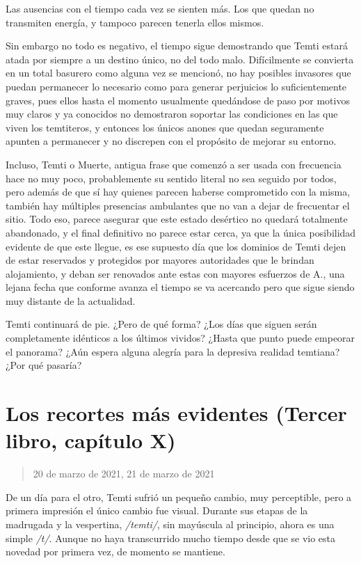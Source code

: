 \documentclass[
]{book}
\begin{document}
Las ausencias con el tiempo cada vez se sienten más. Los que quedan no transmiten energía, y tampoco parecen tenerla ellos mismos.

Sin embargo no todo es negativo, el tiempo sigue demostrando que Temti estará atada por siempre a un destino único, no del todo malo. Difícilmente se convierta en un total basurero como alguna vez se mencionó, no hay posibles invasores que puedan permanecer lo necesario como para generar perjuicios lo suficientemente graves, pues ellos hasta el momento usualmente quedándose de paso por motivos muy claros y ya conocidos no demostraron soportar las condiciones en las que viven los temtiteros, y entonces los únicos anones que quedan seguramente apunten a permanecer y no discrepen con el propósito de mejorar su entorno.

Incluso, Temti o Muerte, antigua frase que comenzó a ser usada con frecuencia hace no muy poco, probablemente su sentido literal no sea seguido por todos, pero además de que sí hay quienes parecen haberse comprometido con la misma, también hay múltiples presencias ambulantes que no van a dejar de frecuentar el sitio. Todo eso, parece asegurar que este estado desértico no quedará totalmente abandonado, y el final definitivo no parece estar cerca, ya que la única posibilidad evidente de que este llegue, es ese supuesto día que los dominios de Temti dejen de estar reservados y protegidos por mayores autoridades que le brindan alojamiento, y deban ser renovados ante estas con mayores esfuerzos de A., una lejana fecha que conforme avanza el tiempo se va acercando pero que sigue siendo muy distante de la actualidad.

Temti continuará de pie. ¿Pero de qué forma? ¿Los días que siguen serán completamente idénticos a los últimos vividos? ¿Hasta que punto puede empeorar el panorama? ¿Aún espera alguna alegría para la depresiva realidad temtiana? ¿Por qué pasaría?

\hypertarget{los-recortes-muxe1s-evidentes-tercer-libro-capuxedtulo-x}{%
\section{Los recortes más evidentes (Tercer libro, capítulo X)}\label{los-recortes-muxe1s-evidentes-tercer-libro-capuxedtulo-x}}

\begin{quote}
20 de marzo de 2021, 21 de marzo de 2021
\end{quote}

De un día para el otro, Temti sufrió un pequeño cambio, muy perceptible, pero a primera impresión el único cambio fue visual. Durante sus etapas de la madrugada y la vespertina, \emph{/temti/}, sin mayúscula al principio, ahora es una simple \emph{/t/}. Aunque no haya transcurrido mucho tiempo desde que se vio esta novedad por primera vez, de momento se mantiene.
\end{document}

